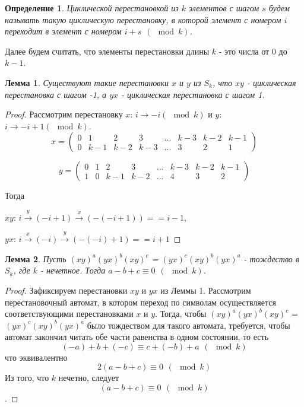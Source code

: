 \documentclass{article}
\newtheorem{lemma}{Лемма}
\newtheorem{definition}{Определение}
\begin{document}
	\begin{definition}
		Циклической перестановкой из $k$ элементов с шагом $s$ будем называть такую циклическую перестановку, в которой элемент с номером $i$ переходит в элемент с номером $i+s \hspace{5pt} (\mod k)$. 
	\end{definition}

	Далее будем считать, что элементы перестановки длины $k$ - это числа от $0$ до $k-1$.
	
	\begin{lemma}
		Существуют такие перестановки $x$ и $y$ из $S_k$, что $xy$ - циклическая перестановка с шагом -1, а $yx$ - циклическая перестановка с шагом 1.
	\end{lemma}
	\begin{proof}
		Рассмотрим перестановку $x$: $i \rightarrow -i (\mod k)$ и $y$: $i \rightarrow -i+1 (\mod k)$.
		$$
		x = 
		\begin{pmatrix}
		0&1&2&3&...&k-3&k-2&k-1\\
		0&k-1&k-2&k-3&...&3&2&1
		\end{pmatrix}
		$$
		
		$$
		y = 
		\begin{pmatrix}
		0&1&2&3&...&k-3&k-2&k-1\\
		1&0&k-1&k-2&...&4&3&2
		\end{pmatrix}
		$$
		
		Тогда 
		
		$xy$: $i \xrightarrow y (-i+1) \xrightarrow x (-(-i+1)) == i-1$,
		
		$yx$: $i \xrightarrow x (-i) \xrightarrow y (-(-i)+1) == i+1$
		
	\end{proof}
	
	\begin{lemma}
		Пусть $(xy)^a(yx)^b(xy)^c$ = $(yx)^c(xy)^b(yx)^a$ - тождество в $S_k$, где $k$ - нечетное. Тогда $a - b + c \equiv 0 \hspace{5pt} (\mod k)$.
	\end{lemma}
	\begin{proof}
		Зафиксируем перестановки $xy$ и $yx$ из Леммы 1.
		Рассмотрим перестановочный автомат, в котором переход по символам осуществляется соответствующими перестановками $x$ и $y$. Тогда, чтобы $(xy)^a(yx)^b(xy)^c$ = $(yx)^c(xy)^b(yx)^a$ было тождеством для такого автомата, требуется, чтобы автомат закончил читать обе части равенства в одном состоянии, то есть	
		\begin{equation}
			(-a) + b + (-c) \equiv c + (-b) + a \hspace{5pt} (\mod k)
		\end{equation}
		что эквивалентно 
		\begin{equation}
		2(a - b + c) \equiv 0 \hspace{5pt} (\mod k)
		\end{equation}
		Из того, что $k$ нечетно, следует 
		$$
			(a - b + c) \equiv 0 \hspace{5pt} (\mod k)
		$$.
	\end{proof}
\end{document}
